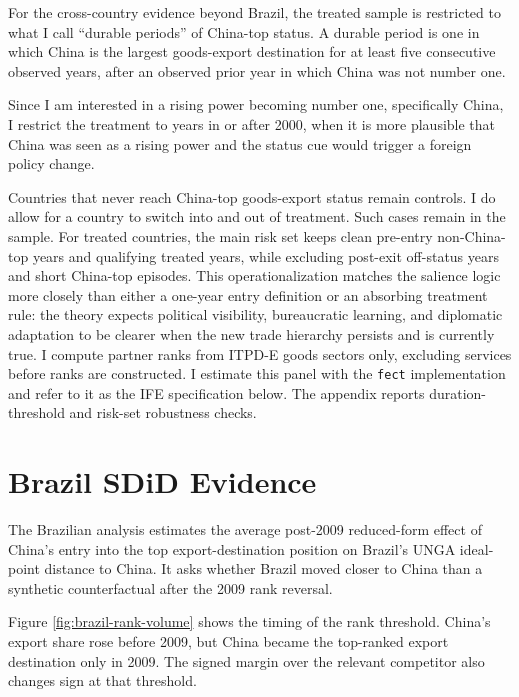 \documentclass[referee,pdflatex,sn-basic]{sn-jnl}
\theoremstyle{thmstylethree}
\begin{document}
For the cross-country evidence beyond Brazil, the treated sample is restricted to what I call ``durable periods'' of China-top status. A durable period is one in which China is the largest goods-export destination for at least five consecutive observed years, after an observed prior year in which China was not number one.

Since I am interested in a rising power becoming number one, specifically China, I restrict the treatment to years in or after 2000, when it is more plausible that China was seen as a rising power and the status cue would trigger a foreign policy change.

Countries that never reach China-top goods-export status remain controls. I do allow for a country to switch into and out of treatment. Such cases remain in the sample. For treated countries, the main risk set keeps clean pre-entry non-China-top years and qualifying treated years, while excluding post-exit off-status years and short China-top episodes. This operationalization matches the salience logic more closely than either a one-year entry definition or an absorbing treatment rule: the theory expects political visibility, bureaucratic learning, and diplomatic adaptation to be clearer when the new trade hierarchy persists and is currently true. I compute partner ranks from ITPD-E goods sectors only, excluding services before ranks are constructed. I estimate this panel with the \texttt{fect} implementation and refer to it as the IFE specification below. The appendix reports duration-threshold and risk-set robustness checks.

\section{Brazil SDiD Evidence}\label{brazil-sdid-evidence}

The Brazilian analysis estimates the average post-2009 reduced-form effect of China's entry into the top export-destination position on Brazil's UNGA ideal-point distance to China. It asks whether Brazil moved closer to China than a synthetic counterfactual after the 2009 rank reversal.

Figure \ref{fig:brazil-rank-volume} shows the timing of the rank threshold. China's export share rose before 2009, but China became the top-ranked export destination only in 2009. The signed margin over the relevant competitor also changes sign at that threshold.
\end{document}
